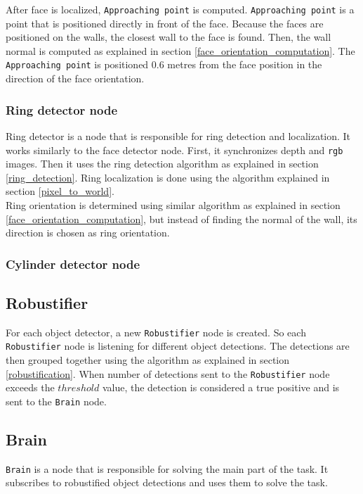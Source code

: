 \documentclass[12pt,a4paper]{article}
\begin{document}
	After face is localized, \texttt{Approaching point} is computed. \texttt{Approaching point} is a point that is positioned directly in front of the face. Because the faces are positioned on the walls, the closest wall to the face is found. Then, the wall normal is computed as explained in section \ref{face_orientation_computation}. The \texttt{Approaching point} is positioned 0.6 metres from the face position in the direction of the face orientation. \\

	\subsubsection{Ring detector node}
	Ring detector is a node that is responsible for ring detection and localization. It works similarly to the face detector node. First, it synchronizes depth and \texttt{rgb} images. Then it uses the ring detection algorithm as explained in section \ref{ring_detection}. Ring localization is done using the algorithm explained in section \ref{pixel_to_world}. \\
	
	Ring orientation is determined using similar algorithm as explained in section \ref{face_orientation_computation}, but instead of finding the normal of the wall, its direction is chosen as ring orientation. \\ %
	
	\subsubsection{Cylinder detector node}

	\subsection{Robustifier}
	For each object detector, a new \texttt{Robustifier} node is created. So each \texttt{Robustifier} node is listening for different object detections. The detections are then grouped together using the algorithm as explained in section \ref{robustification}. When number of detections sent to the \texttt{Robustifier} node exceeds the $threshold$ value, the detection is considered a true positive and is sent to the \texttt{Brain} node. \\
	
	\subsection{Brain}
	\texttt{Brain} is a node that is responsible for solving the main part of the task. It subscribes to robustified object detections and uses them to solve the task. \\
	
\end{document}
